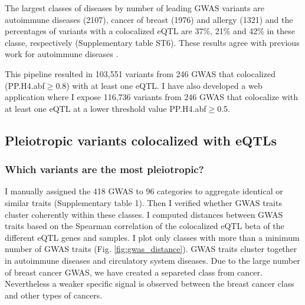 The largest classes of diseases by number of leading GWAS variants are autoimmune diseases (2107), cancer of breast (1976) and allergy (1321)
%
and the percentages of variants with a colocalized eQTL are 37\%, 21\% and 42\% in these classe, respectively (Supplementary table ST6).
%
%
These results agree with previous work for autoimmune diseases \citep{2021.Li.Mu}.

This pipeline resulted in 103,551 variants from 246 GWAS that colocalized (PP.H4.abf$\geq$0.8) with at least one eQTL.
%
I have also developed a web application where I expose 116,736 variants from 246 GWAS that colocalize with at least one eQTL at a lower threshold value PP.H4.abf$\geq$0.5.

\subsection*{Pleiotropic variants colocalized with eQTLs}

\subsubsection*{Which variants are the most pleiotropic?}

I manually assigned the 418 GWAS to 96 categories to aggregate identical or similar traits (Supplementary table 1).
%
Then I verified whether GWAS traits cluster coherently within these classes.
%
I computed distances between GWAS traits based on the Spearman correlation of the colocalized eQTL beta of the different eQTL genes and samples.
%
I plot only classes with more than a minimum number of GWAS traits (Fig. \ref{fig:gwas_distance}).
%
GWAS traits cluster together in autoimmune diseases and circulatory system diseases.
%
Due to the large number of breast cancer GWAS, we have created a separeted class from cancer.
Nevertheless a weaker specific signal is observed between the breast cancer class and other types of cancers.


